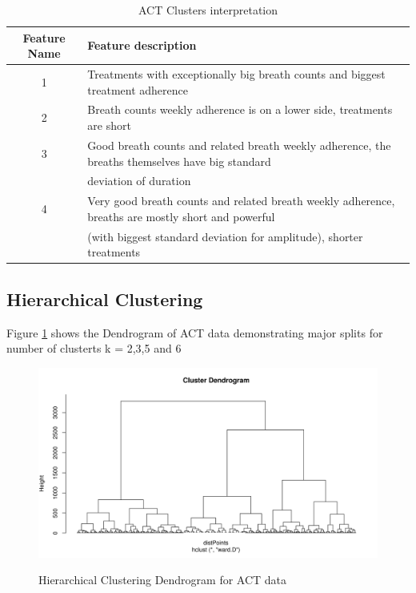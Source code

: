 \documentclass{article}
\begin{document}
\begin{table}[htb]
  \caption{ACT Clusters interpretation}
  \label{tab:act_interpret}
  \centering
  \begin{tabular}{ c|l}
    \toprule
    
  \textbf{Feature Name} & \textbf{Feature description} \\
  \midrule
    1 & Treatments with exceptionally big breath counts and biggest treatment adherence \\
  \midrule
    2 & Breath counts weekly adherence is on a lower side, treatments are short \\
  \midrule
    3 & Good breath counts and related breath weekly adherence, the breaths themselves have big standard  \\ 
    ~ &  deviation of duration \\
  \midrule
    4 & Very good breath counts and related breath weekly adherence,  breaths are mostly short and powerful \\ 
    ~ & (with biggest standard deviation for amplitude), shorter treatments  \\
  \bottomrule
    \end{tabular}
\end{table}

\subsection{Hierarchical Clustering}
Figure \ref{fig:figACTdent} shows the Dendrogram of ACT data demonstrating major splits for number of clusterts k = 2,3,5 and 6

\begin{figure}[htb]
  \centering
  \caption{ Hierarchical Clustering Dendrogram for ACT data}
  \includegraphics[scale=0.5]{fig_ACT_HC_dentogram.png}
  \label{fig:figACTdent}
\end{figure}
\end{document}
